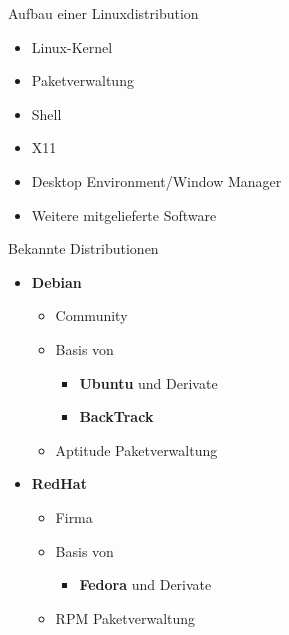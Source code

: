 
\begin{slide}{Aufbau einer Linuxdistribution}
	\begin{itemize}
		\item{Linux-Kernel}
		\item{Paketverwaltung}
		\item{Shell}
		\item{X11}
		\item{Desktop Environment/Window Manager}
		\item{Weitere mitgelieferte Software}
	\end{itemize}
\end{slide}

\begin{slide}{Bekannte Distributionen}
	\begin{itemize}
		\item{\textbf{Debian}
			\begin{itemize}
				\item{Community}
				\item{Basis von
				\begin{itemize}
				 	\item{\textbf{Ubuntu} und Derivate}
					\item{\textbf{BackTrack}}
				\end{itemize}
				}
				\item{Aptitude Paketverwaltung}
			\end{itemize}
		}
		\item{\textbf{RedHat}
			\begin{itemize}
				\item{Firma}
				\item{Basis von
					\begin{itemize}
						\item{\textbf{Fedora} und Derivate}
					\end{itemize}
				}
				\item{RPM Paketverwaltung}
			\end{itemize}
		}
	\end{itemize}
\end {slide}

